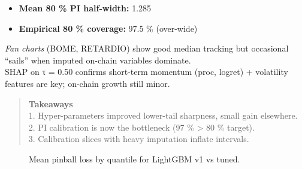 \documentclass[
  a4paper,
  DIV=11,
  numbers=noendperiod]{scrreprt}
\providecommand{\tightlist}{%
  \setlength{\itemsep}{0pt}\setlength{\parskip}{0pt}}
\begin{document}
\begin{itemize}
\tightlist
\item
  \textbf{Mean 80 \% PI half-width:} 1.285\\
\item
  \textbf{Empirical 80 \% coverage:} 97.5 \% (over-wide)
\end{itemize}

\emph{Fan charts} (BOME, RETARDIO) show good median tracking but
occasional ``sails'' when imputed on-chain variables dominate.\\
SHAP on τ = 0.50 confirms short-term momentum (proc, logret) +
volatility features are key; on-chain growth still minor.

\begin{quote}
\textbf{Takeaways}\\
1. Hyper-parameters improved lower-tail sharpness, small gain
elsewhere.\\
2. PI calibration is now the bottleneck (97 \% \textgreater{} 80 \%
target).\\
3. Calibration slices with heavy imputation inflate intervals.
\end{quote}

\begin{figure}


\caption{\label{fig-lgbm-v1-vs-tuned-pinball}Mean pinball loss by
quantile for LightGBM v1 vs tuned.}

\end{figure}%
\end{document}
